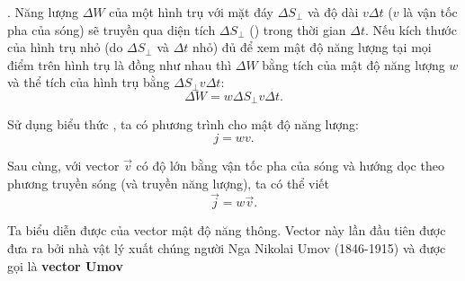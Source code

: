.
Năng lượng $\Delta{W}$ của một hình trụ với mặt đáy $\Delta{S}_{\perp}$ và độ dài $v\Delta{t}$ ($v$ là vận tốc pha của sóng) sẽ truyền qua diện tích $\Delta{S}_{\perp}$ () trong thời gian $\Delta{t}$. Nếu kích thước của hình trụ nhỏ (do $\Delta{S}_{\perp}$ và $\Delta{t}$ nhỏ) đủ để xem mật độ năng lượng tại mọi điểm trên hình trụ là đồng như nhau thì $\Delta{W}$ bằng tích của mật độ năng lượng $w$ và thể tích của hình trụ bằng $\Delta{S}_{\perp}v\Delta{t}$:
\begin{equation*}
	\Delta{W} = w \Delta{S}_{\perp} v \Delta{t}.
\end{equation*}

\noindent
Sử dụng biểu thức , ta có phương trình cho mật độ năng lượng:
\begin{equation}\label{eq:14_46}
	j = wv.
\end{equation}

\noindent
Sau cùng, với vector $\vec{v}$ có độ lớn bằng vận tốc pha của sóng và hướng dọc theo phương truyền sóng (và truyền năng lượng), ta có thể viết
\begin{equation}\label{eq:14_47}
	\vec{j} = w \vec{v}.
\end{equation}

Ta biểu diễn được của vector mật độ năng thông. Vector này lần đầu tiên được đưa ra bởi nhà vật lý xuất chúng người Nga Nikolai Umov (1846-1915) và được gọi là \textbf{vector Umov}


